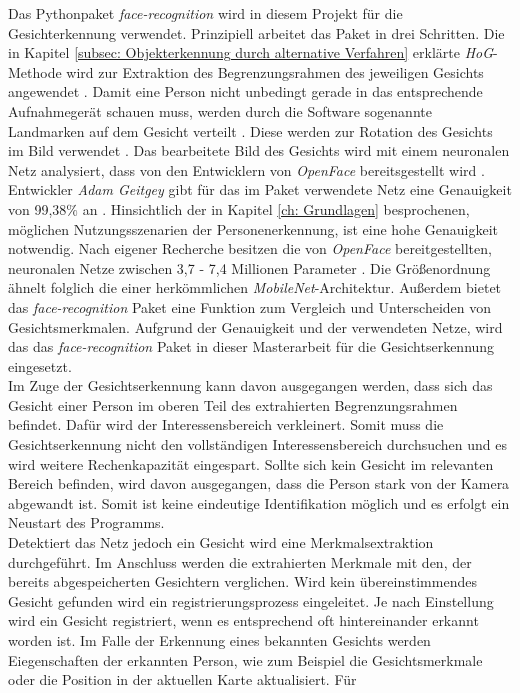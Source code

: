 	Das Pythonpaket \textit{face-recognition} wird in diesem Projekt für die Gesichterkennung verwendet. Prinzipiell arbeitet das Paket in drei Schritten. Die in Kapitel \ref{subsec: Objekterkennung durch alternative Verfahren} erklärte \textit{HoG}-Methode wird zur Extraktion des Begrenzungsrahmen des jeweiligen Gesichts angewendet \cite{facerecarticle}. Damit eine Person nicht unbedingt gerade in das entsprechende Aufnahmegerät schauen muss, werden durch die Software sogenannte Landmarken auf dem Gesicht verteilt \cite{facerecarticle}. Diese werden zur Rotation des Gesichts im Bild verwendet \cite{facerecarticle}. Das bearbeitete Bild des Gesichts wird mit einem neuronalen Netz analysiert, dass von den Entwicklern von \textit{OpenFace} bereitsgestellt wird \cite{facerecarticle}. Entwickler \textit{Adam Geitgey} gibt für das im Paket verwendete Netz eine Genauigkeit von 99,38$\percent$ an \cite{facerecognition}. Hinsichtlich der in Kapitel \ref{ch: Grundlagen} besprochenen, möglichen Nutzungsszenarien der Personenerkennung, ist eine hohe Genauigkeit notwendig. Nach eigener Recherche besitzen die von \textit{OpenFace} bereitgestellten, neuronalen Netze zwischen 3,7 - 7,4 Millionen Parameter \cite{openface}. Die Größenordnung ähnelt folglich die einer herkömmlichen \textit{MobileNet}-Architektur. Außerdem bietet das \textit{face-recognition} Paket eine Funktion zum Vergleich und Unterscheiden von Gesichtsmerkmalen. Aufgrund der Genauigkeit und der verwendeten Netze, wird das das \textit{face-recognition} Paket in dieser Masterarbeit für die Gesichtserkennung eingesetzt.\\
	
	Im Zuge der Gesichtserkennung kann davon ausgegangen werden, dass sich das Gesicht einer Person im oberen Teil des extrahierten Begrenzungsrahmen befindet. Dafür wird der Interessensbereich verkleinert. Somit muss die Gesichtserkennung nicht den vollständigen Interessensbereich durchsuchen und es wird weitere Rechenkapazität eingespart. Sollte sich kein Gesicht im relevanten Bereich befinden, wird davon ausgegangen, dass die Person stark von der Kamera abgewandt ist. Somit ist keine eindeutige Identifikation möglich und es erfolgt ein Neustart des Programms.\\
	
	Detektiert das Netz jedoch ein Gesicht wird eine Merkmalsextraktion durchgeführt. Im Anschluss werden die extrahierten Merkmale mit den, der bereits abgespeicherten Gesichtern verglichen. Wird kein übereinstimmendes Gesicht gefunden wird ein registrierungsprozess eingeleitet. Je nach Einstellung wird ein Gesicht registriert, wenn es entsprechend oft hintereinander erkannt worden ist. Im Falle der Erkennung eines bekannten Gesichts werden Eiegenschaften der erkannten Person, wie zum Beispiel die Gesichtsmerkmale oder die Position in der aktuellen Karte aktualisiert. Für \\ 
	
